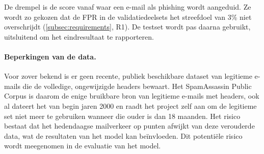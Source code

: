 De drempel is de score vanaf waar een e-mail als phishing wordt aangeduid. Ze wordt zo gekozen dat de FPR in de validatiedeelsets het streefdoel van 3\% niet overschrijdt (\ref{subsec:requirements}, R1). De testset wordt pas daarna gebruikt, uitsluitend om het eindresultaat te rapporteren.

\paragraph{Beperkingen van de data.}
Voor zover bekend is er geen recente, publiek beschikbare dataset van legitieme e-mails die de volledige, ongewijzigde headers bewaart. Het SpamAssassin Public Corpus is daarom de enige bruikbare bron van legitieme e-mails met headers, ook al dateert het van begin jaren 2000 en raadt het project zelf aan om de legitieme set niet meer te gebruiken wanneer die ouder is dan 18 maanden.
Het risico bestaat dat het hedendaagse mailverkeer op punten afwijkt van deze verouderde data, wat de resultaten van het model kan beïnvloeden. Dit potentiële risico wordt meegenomen in de evaluatie van het model.